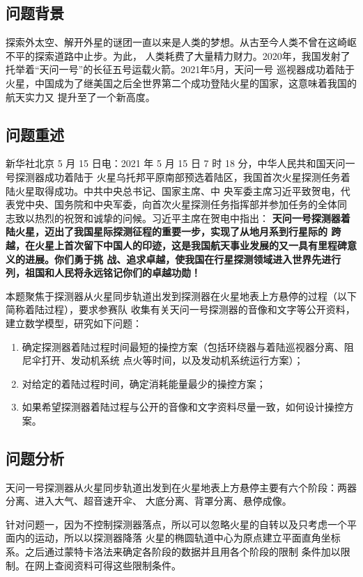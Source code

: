 \documentclass[hyperref,a4paper,UTF8]{ctexart}
\begin{document}
\subsection{问题背景}
探索外太空、解开外星的谜团一直以来是人类的梦想。从古至今人类不曾在这崎岖不平的探索道路中止步。为此，
人类耗费了大量精力财力。2020年，我国发射了托举着“天问一号”的长征五号运载火箭。2021年5月，天问一号
巡视器成功着陆于火星，中国成为了继美国之后全世界第二个成功登陆火星的国家，这意味着我国的航天实力又
提升至了一个新高度。
\subsection{问题重述}
新华社北京 5 月 15 日电：2021 年 5 月 15 日 7 时 18 分，中华人民共和国天问一号探测器成功着陆于
火星乌托邦平原南部预选着陆区，我国首次火星探测任务着陆火星取得成功。中共中央总书记、国家主席、中
央军委主席习近平致贺电，代表党中央、国务院和中央军委，向首次火星探测任务指挥部并参加任务的全体同
志致以热烈的祝贺和诚挚的问候。习近平主席在贺电中指出：%
\textbf{天问一号探测器着陆火星，迈出了我国星际探测征程的重要一步，实现了从地月系到行星际的
    跨越，在火星上首次留下中国人的印迹，这是我国航天事业发展的又一具有里程碑意义的进展。你们勇于挑
    战、追求卓越，使我国在行星探测领域进入世界先进行列，祖国和人民将永远铭记你们的卓越功勋！}

本题聚焦于探测器从火星同步轨道出发到探测器在火星地表上方悬停的过程（以下简称着陆过程），要求参赛队
收集有关天问一号探测器的音像和文字等公开资料，建立数学模型，研究如下问题：
\begin{enumerate}
    \item 确定探测器着陆过程时间最短的操控方案（包括环绕器与着陆巡视器分离、阻尼伞打开、发动机系统
          点火等时间，以及发动机系统运行方案）；
    \item 对给定的着陆过程时间，确定消耗能量最少的操控方案；
    \item 如果希望探测器着陆过程与公开的音像和文字资料尽量一致，如何设计操控方案。
\end{enumerate}
\subsection{问题分析}
天问一号探测器从火星同步轨道出发到在火星地表上方悬停主要有六个阶段：两器分离、进入大气、超音速开伞、
大底分离、背罩分离、悬停成像。

针对问题一，因为不控制探测器落点，所以可以忽略火星的自转以及只考虑一个平面内的运动，所以以探测器降落
火星的椭圆轨道中心为原点建立平面直角坐标系。之后通过蒙特卡洛法来确定各阶段的数据并且用各个阶段的限制
条件加以限制。在网上查阅资料可得这些限制条件。
\end{document}

